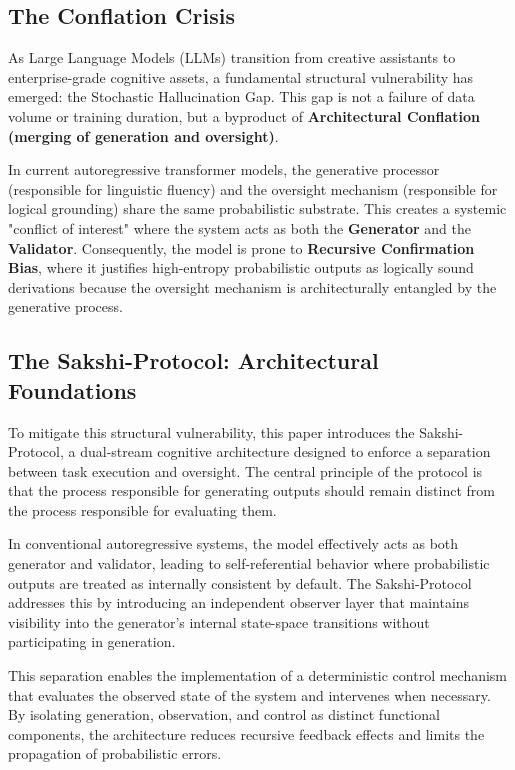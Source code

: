 \documentclass[12pt,a4paper]{article}
\begin{document}
\subsection{The Conflation Crisis}
As Large Language Models (LLMs) transition from creative assistants to enterprise-grade cognitive assets, a fundamental structural vulnerability has emerged: the Stochastic Hallucination Gap. This gap is not a failure of data volume or training duration, but a byproduct of \textbf{Architectural Conflation (merging of generation and oversight)}.

In current autoregressive transformer models, the generative processor (responsible for linguistic fluency) and the oversight mechanism (responsible for logical grounding) share the same probabilistic substrate. This creates a systemic "conflict of interest" where the system acts as both the \textbf{Generator} and the \textbf{Validator}. Consequently, the model is prone to \textbf{Recursive Confirmation Bias}, where it justifies high-entropy probabilistic outputs as logically sound derivations because the oversight mechanism is architecturally entangled by the generative process.

\subsection{The Sakshi-Protocol: Architectural Foundations}
To mitigate this structural vulnerability, this paper introduces the Sakshi-Protocol, a dual-stream cognitive architecture designed to enforce a separation between task execution and oversight. The central principle of the protocol is that the process responsible for generating outputs should remain distinct from the process responsible for evaluating them.

In conventional autoregressive systems, the model effectively acts as both generator and validator, leading to self-referential behavior where probabilistic outputs are treated as internally consistent by default. The Sakshi-Protocol addresses this by introducing an independent observer layer that maintains visibility into the generator’s internal state-space transitions without participating in generation.

This separation enables the implementation of a deterministic control mechanism that evaluates the observed state of the system and intervenes when necessary. By isolating generation, observation, and control as distinct functional components, the architecture reduces recursive feedback effects and limits the propagation of probabilistic errors.
\end{document}
